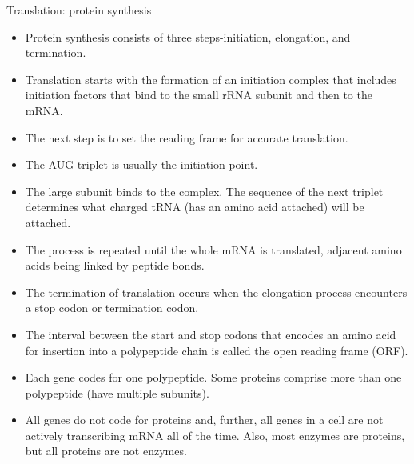 \documentclass[11pt,ignorenonframetext,aspectratio=169]{beamer}
\providecommand{\tightlist}{%
  \setlength{\itemsep}{0pt}\setlength{\parskip}{0pt}}
\begin{document}
\begin{frame}{Translation: protein synthesis}
\protect\hypertarget{translation-protein-synthesis}{}
\begin{itemize}
\tightlist
\item
  Protein synthesis consists of three steps-initiation, elongation, and
  termination.
\item
  Translation starts with the formation of an initiation complex that
  includes initiation factors that bind to the small rRNA subunit and
  then to the mRNA.
\item
  The next step is to set the reading frame for accurate translation.
\item
  The AUG triplet is usually the initiation point.
\item
  The large subunit binds to the complex. The sequence of the next
  triplet determines what charged tRNA (has an amino acid attached) will
  be attached.
\item
  The process is repeated until the whole mRNA is translated, adjacent
  amino acids being linked by peptide bonds.
\end{itemize}
\end{frame}

\begin{frame}{}
\protect\hypertarget{section-26}{}
\begin{itemize}
\tightlist
\item
  The termination of translation occurs when the elongation process
  encounters a stop codon or termination codon.
\item
  The interval between the start and stop codons that encodes an amino
  acid for insertion into a polypeptide chain is called the open reading
  frame (ORF).
\item
  Each gene codes for one polypeptide. Some proteins comprise more than
  one polypeptide (have multiple subunits).
\item
  All genes do not code for proteins and, further, all genes in a cell
  are not actively transcribing mRNA all of the time. Also, most enzymes
  are proteins, but all proteins are not enzymes.
\end{itemize}
\end{frame}
\end{document}

